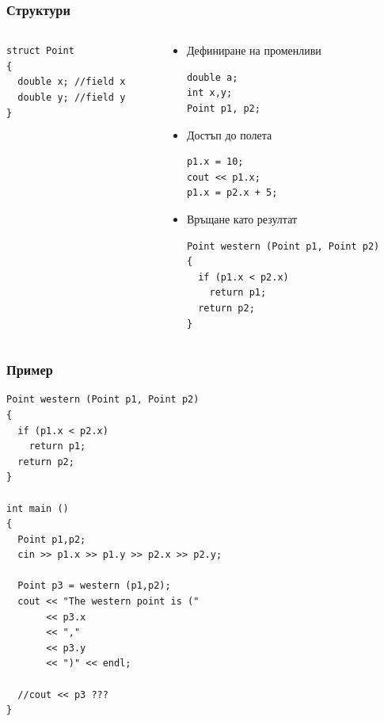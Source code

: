 \documentclass{beamer}
\begin{document}
\begin{frame}[fragile]
\frametitle{Структури} 


\begin{columns}[t]
  \begin{column}{0.3\textwidth}
\begin{lstlisting}
struct Point  
{
  double x; //field x
  double y; //field y
}
\end{lstlisting}  

  \end{column}
  \begin{column}{0.7\textwidth}

\begin{itemize}
\item Дефиниране на променливи
\begin{flushleft}
\begin{lstlisting}
double a; 
int x,y;
Point p1, p2;
\end{lstlisting}  
\end{flushleft}

\item Достъп до полета
\begin{flushleft}
\begin{lstlisting}
p1.x = 10;
cout << p1.x;
p1.x = p2.x + 5;
\end{lstlisting}  
\end{flushleft}


\item Връщане като резултат
\begin{flushleft}
\begin{lstlisting}
Point western (Point p1, Point p2)
{
  if (p1.x < p2.x)
    return p1;
  return p2;
}
\end{lstlisting}  
\end{flushleft}


\end{itemize}


  \end{column}
\end{columns}



\end{frame}



\begin{frame}[fragile]
\frametitle{Пример} 

\begin{lstlisting}
Point western (Point p1, Point p2)
{
  if (p1.x < p2.x)
    return p1;
  return p2;
}

int main ()
{
  Point p1,p2;
  cin >> p1.x >> p1.y >> p2.x >> p2.y;

  Point p3 = western (p1,p2);
  cout << "The western point is (" 
       << p3.x 
       << ","
       << p3.y
       << ")" << endl;

  //cout << p3 ???
}

\end{lstlisting}  

\end{frame}
\end{document}
